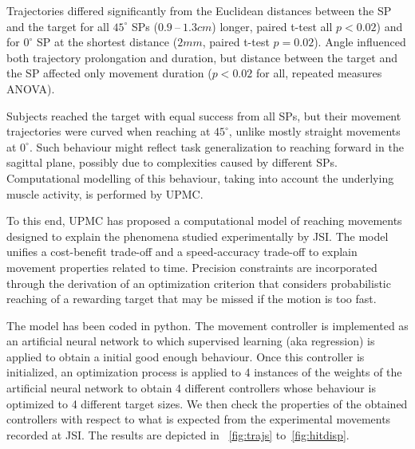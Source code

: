 Trajectories differed significantly from the Euclidean distances between the SP and the target for all $45^{\circ}$ SPs ($0.9~–~1.3 cm$) longer, paired t-test all $p<0.02$) and for $0^{\circ}$ SP at the shortest distance ($2mm$, paired t-test $p = 0.02$). Angle influenced both trajectory prolongation and duration, but distance between the target and the SP affected only movement duration ($p < 0.02$ for all, repeated measures ANOVA).

Subjects reached the target with equal success from all SPs, but their movement trajectories were curved when reaching at $45^{\circ}$, unlike mostly straight movements at $0^{\circ}$. Such behaviour might reflect task generalization to reaching forward in the sagittal plane\cite{GallivanNatureCom2015}, possibly due to complexities caused by different SPs. Computational modelling of this behaviour, taking into account the underlying muscle activity, is performed by UPMC.


To this end, UPMC has proposed a computational model of reaching movements designed to explain the phenomena studied experimentally by JSI. The model unifies a cost-benefit trade-off \cite{rigoux12_plos} and a speed-accuracy trade-off \cite{fitts54_JEP} to explain movement properties related to time. Precision constraints are incorporated through the derivation of an optimization criterion that considers probabilistic reaching of a rewarding target that may be missed if the motion is too fast.

The model has been coded in python. The movement controller is implemented as an artificial neural network to which supervised learning (aka regression) is applied to obtain a initial good enough behaviour. Once this controller is initialized, an optimization process is applied to 4 instances of the weights of the artificial neural network to obtain 4 different controllers whose behaviour is optimized to 4 different target sizes. We then check the properties of the obtained controllers with respect to what is expected from the experimental movements recorded at JSI. The results are depicted in \figurename~\ref{fig:trajs} to~\ref{fig:hitdisp}.

